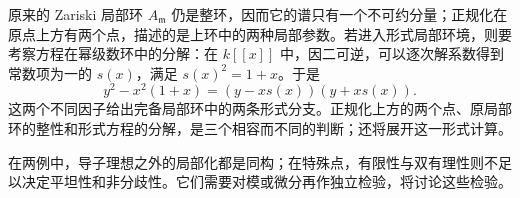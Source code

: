 \ProseParagraphBreak
原来的 Zariski 局部环 \(A_{\mathfrak m}\) 仍是整环，因而它的谱只有一个不可约分量；正规化在原点上方有两个点，描述的是上环中的两种局部参数。若进入形式局部环境，则要考察方程在幂级数环中的分解：在 \(k[[x]]\) 中，因二可逆，可以逐次解系数得到常数项为一的 \(s(x)\)，满足 \(s(x)^2=1+x\)。于是
\[
	y^2-x^2(1+x)=(y-xs(x))(y+xs(x)).
\]
这两个不同因子给出完备局部环中的两条形式分支。正规化上方的两个点、原局部环的整性和形式方程的分解，是三个相容而不同的判断；还将展开这一形式计算。

\ProseParagraphBreak
在两例中，导子理想之外的局部化都是同构；在特殊点，有限性与双有理性则不足以决定平坦性和非分歧性。它们需要对模或微分再作独立检验，将讨论这些检验。
